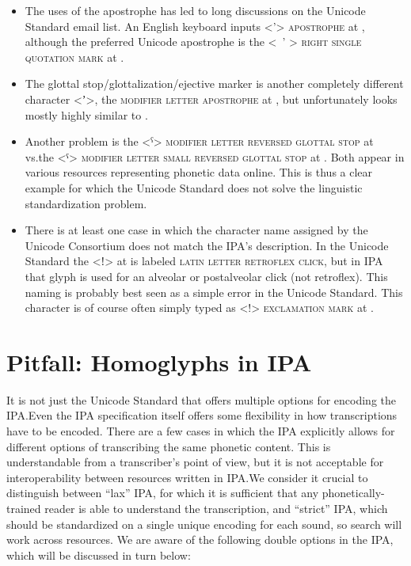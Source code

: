 \begin{itemize}
	\item The uses of the apostrophe has led to long discussions on the Unicode
       Standard email list. An English keyboard inputs <{'}> \textsc{apostrophe}
       at , although the preferred Unicode apostrophe is the <\ ' >
       \textsc{right single quotation mark} at .
     \item The glottal stop/glottalization/ejective marker is another completely
        different character <{\large ʼ}>, the \textsc{modifier letter apostrophe} at
        , but unfortunately looks mostly highly similar to
        . 
	\item Another problem is the <ˁ> \textsc{modifier letter reversed
       glottal stop} at  vs.\@ the <ˤ> \textsc{modifier
       letter small reversed glottal stop} at . Both 
       appear in various resources representing phonetic data online. This is
       thus a clear example for which the Unicode Standard does not solve the
       linguistic standardization problem. 
	\item There is at least one case in which the character name assigned by the
       Unicode Consortium does not match the IPA's description. In the Unicode
       Standard the <ǃ> at  is labeled \textsc{latin letter retroflex
       click}, but in IPA that glyph is used for an alveolar or postalveolar
       click (not retroflex). This naming is probably best seen as a simple
       error in the Unicode Standard. This character is of course often simply
       typed as <!> \textsc{exclamation mark} at . \end{itemize}       

\section{Pitfall: Homoglyphs in IPA}
\label{pitfall-homoglyphs-in-IPA}

It is not just the Unicode Standard that offers multiple options for encoding
the IPA.\@ Even the IPA specification itself offers some flexibility in how
transcriptions have to be encoded. There are a few cases in which the IPA
explicitly allows for different options of transcribing the same phonetic
content. This is understandable from a transcriber's point of view, but it is
not acceptable for interoperability between resources written in IPA.\@ We
consider it crucial to distinguish between ``lax'' IPA, for which it is
sufficient that any phonetically-trained reader is able to understand the
transcription, and ``strict'' IPA, which should be standardized on a single
unique encoding for each sound, so search will work across resources. We are 
aware of the following double options in the IPA, which will be discussed in 
turn below:

